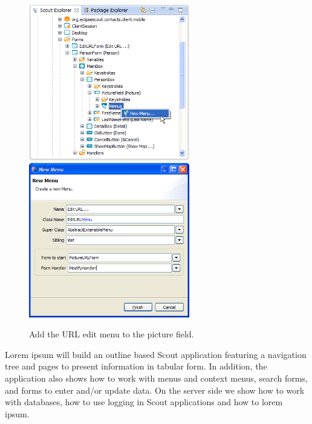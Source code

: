 \documentclass[a4paper,10pt,twoside]{book}
\begin{document}
\begin{figure}
\includegraphics[width=7cm]{new_menu_editurl_contextmenu.png} \hspace{5mm}
\includegraphics[width=7cm]{new_menu_editurl.png}
\caption{Add the URL edit menu to the picture field.}
\end{figure}

Lorem ipsum will build an outline based Scout application featuring a navigation tree and pages to present information in tabular form. 
In addition, the application also shows how to work with menus and context menus, search forms, and forms to enter and/or update data. 
On the server side we show how to work with databases, how to use logging in Scout applications and how to lorem ipsum. 
\end{document}
